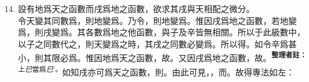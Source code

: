 \begin{enumerate} [label={第\chinese*款}]
	\setcounter{enumi}{13}
	\item 設有地爲天之函數而戌爲地之函數，欲求其戌與天相配之微分。\\
	令天變其同數爲\CJKmove，則地變爲\CJKmove。乃令\CJKmove，則地變爲\CJKmove。惟因戌爲地之函數，若地變爲\CJKmove，則戌變爲\CJKmove。其\CJKmove 各數爲地之他函數，與子及辛皆無相關。所以于此級數中，以子之同數\CJKmove 代之，則天變爲\CJKmove 之時，其戌之同數必變爲\CJKmove。所以得\CJKmove。如令辛爲甚小，則其限必爲\CJKmove。惟因地爲天之函數，故\CJKmove。又因戌爲地之函數，故\CJKmove。\textsuperscript{\textbf{整理者註：}上\textit{巳}當爲\textit{巳}'。}如知戌亦可爲天之函數，則\CJKmove。由此可見，\CJKmove，而\CJKmove。故得專法如左：\\

\end{enumerate}
